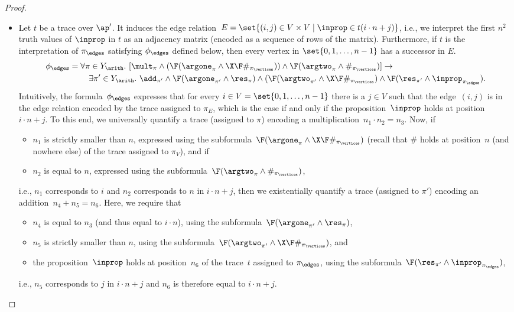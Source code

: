\begin{proof}
\begin{itemize}
	\item 
Let $t$ be a trace over $\ap'$. It induces the edge relation~$E = 
\set{(i,j) \in V\times V \mid \inprop \in t(i\cdot n + j)}$, i.e., we interpret 
the first $n^2$ truth values of $\inprop$ in $t$ as an adjacency matrix (encoded as a sequence of rows of the matrix). Furthermore, if $t$ is the interpretation of $\pi_\edges$ satisfying $\phi_\edges$ defined below, then every vertex in $\set{0,1,\ldots, n-1}$ has a successor in $E$.
	\begin{align*}
	\phi_\edges ={}&{} \forall \pi \in Y_\arith.\ [\mult_\pi \wedge (\F (\argone_{\pi} \wedge \X\F \#_{\pi_\vertices}))\wedge \F(\argtwo_\pi \wedge \#_{\pi_\vertices})]\rightarrow \\
	{}&{}\quad\exists \pi' \in Y_\arith.\ 
	\add_{\pi'} \wedge 
	\F(\argone_{\pi'} \wedge \res_{\pi}) \wedge 
	(\F (\argtwo_{\pi'} \wedge \X\F \#_{\pi_\vertices}) \wedge 
	\F(\res_{\pi'} \wedge 
	\inprop_{\pi_\edges}).
	\end{align*}
Intuitively, the formula~$\phi_\edges$ expresses that for every $i \in V = \set{0,1,\ldots, n-1}$ there is a $j \in V$ such that the edge~$(i,j)$ is in the edge relation encoded by the trace assigned to $\pi_E$, which is the case if and only if the proposition~$\inprop$ holds at position~$i \cdot n +j$.
To this end, we universally quantify a trace (assigned to $\pi$) encoding a multiplication~$n_1 \cdot n_2= n_3$.
Now, if 
\begin{itemize}
    \item $n_1$ is strictly smaller than $n$, expressed using the subformula~$\F (\argone_{\pi} \wedge \X\F \#_{\pi_\vertices})$ (recall that $\#$ holds at position~$n$ (and nowhere else) of the trace assigned to $\pi_V$), and if
    \item $n_2$ is equal to $n$, expressed using the subformula~$\F(\argtwo_\pi \wedge \#_{\pi_\vertices})$,
\end{itemize}
i.e., $n_1$ corresponds to $i$ and $n_2$ corresponds to $n$ in $i \cdot n +j$,
then we existentially quantify a trace (assigned to $\pi'$) encoding an addition~$n_4 + n_5 = n_6$.
Here, we require that
\begin{itemize}
    \item $n_4 $ is equal to $ n_3$ (and thus equal to $i \cdot n$), using the subformula~$\F(\argone_{\pi'} \wedge \res_{\pi})$,
    \item $n_5$ is strictly smaller than $n$, using the subformula~$\F (\argtwo_{\pi'} \wedge \X\F \#_{\pi_\vertices})$, and
    \item the proposition~$\inprop$ holds at position~$n_6$ of the trace~$t$ assigned to $\pi_\edges$, using the subformula~$\F(\res_{\pi'} \wedge 
	\inprop_{\pi_\edges})$,
\end{itemize}
i.e., $n_5$ corresponds to $j$ in $i \cdot n +j$ and $n_6$ is therefore equal to $i \cdot n +j$.


\end{itemize}
\end{proof}
